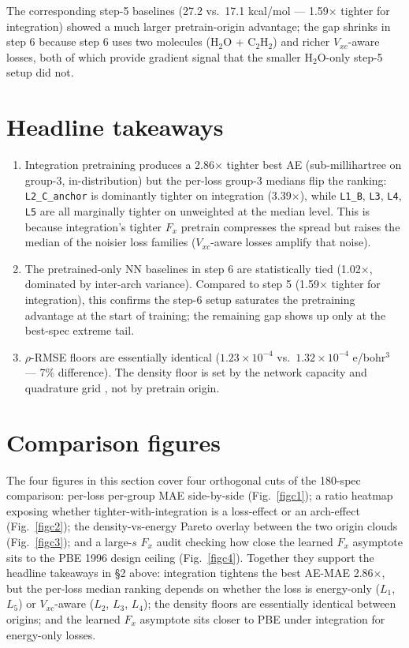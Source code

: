 \documentclass[11pt,letterpaper]{article}
\begin{document}
The corresponding step-5 baselines (27.2 vs.\ 17.1 kcal/mol --- 1.59$\times$
tighter for integration) showed a much larger pretrain-origin advantage; the
gap shrinks in step 6 because step 6 uses two molecules (H$_2$O + C$_2$H$_2$)
and richer $V_{xc}$-aware losses, both of which provide gradient signal that
the smaller H$_2$O-only step-5 setup did not.

\section{Headline takeaways}

\begin{enumerate}
\item Integration pretraining produces a 2.86$\times$ tighter best AE
  (sub-millihartree on group-3, in-distribution) but the per-loss group-3
  medians flip the ranking: \texttt{L2\_C\_anchor} is dominantly tighter on
  integration (3.39$\times$), while \texttt{L1\_B}, \texttt{L3}, \texttt{L4},
  \texttt{L5} are all marginally tighter on unweighted at the median level.
  This is because integration's tighter $F_x$ pretrain compresses the spread
  but raises the median of the noisier loss families ($V_{xc}$-aware losses
  amplify that noise).
\item The pretrained-only NN baselines in step 6 are statistically tied
  (1.02$\times$, dominated by inter-arch variance). Compared to step 5
  (1.59$\times$ tighter for integration), this confirms the step-6 setup
  saturates the pretraining advantage at the start of training; the
  remaining gap shows up only at the best-spec extreme tail.
\item $\rho$-RMSE floors are essentially identical
  ($1.23\!\times\!10^{-4}$ vs.\ $1.32\!\times\!10^{-4}$ e/bohr$^3$ ---
  7\% difference). The density floor is set by the network capacity and
  quadrature grid \citep{Becke1988}, not by pretrain origin.
\end{enumerate}

\section{Comparison figures}

The four figures in this section cover four orthogonal cuts of the
180-spec comparison: per-loss per-group MAE side-by-side
(Fig.~\ref{figc1}); a ratio heatmap exposing whether tighter-with-integration
is a loss-effect or an arch-effect (Fig.~\ref{figc2}); the
density-vs-energy Pareto overlay between the two origin clouds
(Fig.~\ref{figc3}); and a large-$s$ $F_x$ audit checking how close the
learned $F_x$ asymptote sits to the PBE 1996 design ceiling
(Fig.~\ref{figc4}). Together they support the headline takeaways in
\S2 above: integration tightens the best AE-MAE 2.86$\times$, but the
per-loss median ranking depends on whether the loss is energy-only
($L_1$, $L_5$) or $V_{xc}$-aware ($L_2$, $L_3$, $L_4$); the density
floors are essentially identical between origins; and the learned $F_x$
asymptote sits closer to PBE under integration for energy-only losses.
\end{document}
